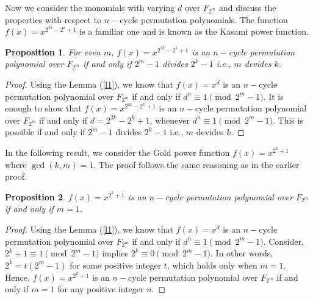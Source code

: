 \documentclass[12pt,a4paper]{article}
\newtheorem{proposition}{Proposition}[section]
\begin{document}
Now we consider the monomials with varying  $ d $ over $ F_{2^{m}} $ and discuss the properties with respect to  $ n-$cycle permutation polynomials. The function $ f(x)=x^{2^{2k}-2^{k}+1} $ is a familiar one and is known as the Kasami power function.
\begin{proposition} For even $ m$,  $f(x)=x^{2^{2k}-2^{k}+1}  $ is an $ n-$cycle permutation polynomial over $ F_{2^{m}} $ if and only if $ 2^{m}-1 $ divides $ 2^{k}-1 $ i.e., $m$ devides $k$.
	
\end{proposition}
\begin{proof}
	Using the Lemma (\ref{l1}), we know that $ f(x)=x^{d} $ is an $ n-$cycle permutation polynomial over $ F_{2^{m}} $ if and only if $ d^{n}\equiv1\pmod{2^{m}-1} $. It is enough  to show that $ f(x)=x^{2^{2k}-2^{k}+1} $ is an $ n-$cycle permutation polynomial over $ F_{2^{m}} $ if and only if $ d=2^{2k}-2^{k}+1 $, whenever $ d^{n}\equiv1\pmod{2^{m}-1} $. This is possible if and only if $ 2^{m}-1 $ divides $ 2^{k}-1 $ i.e., $m$ devides $k$.
\end{proof}
In the following result, we consider the Gold power function $f(x)=x^{2^{k}+1}  $ where $\gcd(k,m)=1$.  The proof follows the same reasoning as in the earlier proof.

\begin{proposition}  $f(x)=x^{2^{k}+1}  $ is an $ n-$cycle permutation polynomial over $ F_{2^{m}} $ if and only if $m=1$.
	
\end{proposition}
\begin{proof}
    Using the Lemma (\ref{l1}), we know that $ f(x)=x^{d} $ is an $ n-$cycle permutation polynomial over $ F_{2^{m}} $ if and only if $ d^{n}\equiv1\pmod{2^{m}-1} $. Consider, $2^k+1\equiv 1 \pmod {2^m - 1} $ implies $2^k\equiv0 \pmod {2^m - 1}$. In other words, $2^k=t(2^m-1)$ for some positive integer $t$, which holds only when $m=1$. Hence, $f(x)=x^{2^{k}+1}  $ is an $ n-$cycle permutation polynomial over $ F_{2^{m}} $ if and only if $m=1$ for any positive integer $n$.
\end{proof}

	
	
\end{document}
